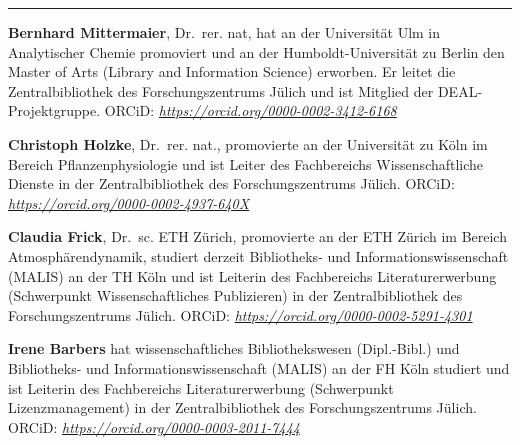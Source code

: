 \begin{center}\rule{0.5\linewidth}{\linethickness}\end{center}

\textbf{Bernhard Mittermaier}, Dr.~rer. nat, hat an der Universität Ulm
in Analytischer Chemie promoviert und an der Humboldt-Universität zu
Berlin den Master of Arts (Library and Information Science) erworben. Er
leitet die Zentralbibliothek des Forschungszentrums Jülich und ist
Mitglied der DEAL-Projektgruppe. ORCiD:
\href{https://orcid.org/0000-0002-3412-6168}{\emph{https://orcid.org/0000-0002-3412-6168}}

\textbf{Christoph Holzke}, Dr.~rer. nat., promovierte an der Universität
zu Köln im Bereich Pflanzenphysiologie und ist Leiter des Fachbereichs
Wissenschaftliche Dienste in der Zentralbibliothek des
Forschungszentrums Jülich. ORCiD:
\href{https://orcid.org/0000-0002-4937-640X}{\emph{https://orcid.org/0000-0002-4937-640X}}

\textbf{Claudia Frick}, Dr.~sc. ETH Zürich, promovierte an der ETH
Zürich im Bereich Atmosphärendynamik, studiert derzeit Bibliotheks- und
Informationswissenschaft (MALIS) an der TH Köln und ist Leiterin des
Fachbereichs Literaturerwerbung (Schwerpunkt Wissenschaftliches
Publizieren) in der Zentralbibliothek des Forschungszentrums Jülich.
ORCiD:
\href{https://orcid.org/0000-0002-5291-4301}{\emph{https://orcid.org/0000-0002-5291-4301}}

\textbf{Irene Barbers} hat wissenschaftliches Bibliothekswesen
(Dipl.-Bibl.) und Bibliotheks- und Informationswissenschaft (MALIS) an
der FH Köln studiert und ist Leiterin des Fachbereichs
Literaturerwerbung (Schwerpunkt Lizenzmanagement) in der
Zentralbibliothek des Forschungszentrums Jülich. ORCiD:
\href{https://orcid.org/0000-0003-2011-7444}{\emph{https://orcid.org/0000-0003-2011-7444}}
